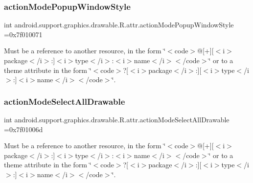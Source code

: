 \subsubsection{\texorpdfstring{action\+Mode\+Popup\+Window\+Style}{actionModePopupWindowStyle}}
{\footnotesize\ttfamily int android.\+support.\+graphics.\+drawable.\+R.\+attr.\+action\+Mode\+Popup\+Window\+Style =0x7f010071\hspace{0.3cm}{\ttfamily [static]}}

Must be a reference to another resource, in the form \char`\"{}$<$code$>$@\mbox{[}+\mbox{]}\mbox{[}$<$i$>$package$<$/i$>$\+:\mbox{]}$<$i$>$type$<$/i$>$\+:$<$i$>$name$<$/i$>$$<$/code$>$\char`\"{} or to a theme attribute in the form \char`\"{}$<$code$>$?\mbox{[}$<$i$>$package$<$/i$>$\+:\mbox{]}\mbox{[}$<$i$>$type$<$/i$>$\+:\mbox{]}$<$i$>$name$<$/i$>$$<$/code$>$\char`\"{}. \mbox{\label{classandroid_1_1support_1_1graphics_1_1drawable_1_1R_1_1attr_abc6da55802e4bf9fbde8de6bcf8c814f}} 
\subsubsection{\texorpdfstring{action\+Mode\+Select\+All\+Drawable}{actionModeSelectAllDrawable}}
{\footnotesize\ttfamily int android.\+support.\+graphics.\+drawable.\+R.\+attr.\+action\+Mode\+Select\+All\+Drawable =0x7f01006d\hspace{0.3cm}{\ttfamily [static]}}

Must be a reference to another resource, in the form \char`\"{}$<$code$>$@\mbox{[}+\mbox{]}\mbox{[}$<$i$>$package$<$/i$>$\+:\mbox{]}$<$i$>$type$<$/i$>$\+:$<$i$>$name$<$/i$>$$<$/code$>$\char`\"{} or to a theme attribute in the form \char`\"{}$<$code$>$?\mbox{[}$<$i$>$package$<$/i$>$\+:\mbox{]}\mbox{[}$<$i$>$type$<$/i$>$\+:\mbox{]}$<$i$>$name$<$/i$>$$<$/code$>$\char`\"{}. \mbox{\label{classandroid_1_1support_1_1graphics_1_1drawable_1_1R_1_1attr_adc926923a39f05d2677d14fbd5572909}} 

